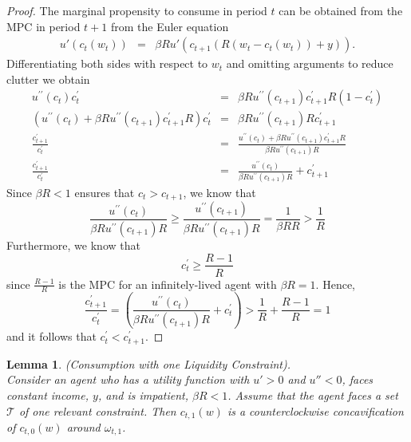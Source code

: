\documentclass[titlepage]{\econtex}
\providecommand{\wAlt}{\omega}
\newtheorem{lemma}{Lemma}
\begin{document}
	\begin{proof}
	The marginal propensity to consume in period $t$ can be obtained from the MPC in period $t+1$ from the Euler equation
	\begin{eqnarray*}
		u'(c_{t}(w_{t})) & =  & \beta R u'(c_{t+1}(R(w_{t}-c_{t}(w_{t}))+{y})).
	\end{eqnarray*}
	Differentiating both sides with respect to $w_{t}$ and omitting arguments to reduce
	clutter we obtain
	\begin{eqnarray*}
		u^{\prime\prime}(c_{t})c_{t}^{\prime} & =  & \beta R u^{\prime\prime}(c_{t+1})c_{t+1}^{\prime}R(1-c_{t}^{\prime}) \nonumber
		\\ \nonumber (u^{\prime\prime}(c_{t}) + \beta R u^{\prime\prime}(c_{t+1})c_{t+1}^{\prime}R)c_{t}^{\prime} & = & \beta R u^{\prime\prime}(c_{t+1})Rc_{t+1}^{\prime}
		\\ \frac{c_{t+1}^{\prime}}{c_{t}^{\prime}}   & = & \frac{u^{\prime\prime}(c_{t}) + \beta R u^{\prime\prime}(c_{t+1})c_{t+1}^{\prime}R}{\beta R u^{\prime\prime}(c_{t+1})R} \label{eq:mpcPF} \\
		\frac{c_{t+1}^{\prime}}{c_{t}^{\prime}}   & = & \frac{u^{\prime\prime}(c_{t})}{\beta R u^{\prime\prime}(c_{t+1})R} + c_{t+1}^{\prime} %
	\end{eqnarray*}
	Since $\beta R < 1$ ensures that $c_{t} > c_{t+1}$, we know that
	\[\frac{u^{\prime\prime}(c_{t})}{\beta R u^{\prime\prime}(c_{t+1})R} \geq  \frac{u^{\prime\prime}(c_{t+1})}{\beta R u^{\prime\prime}(c_{t+1})R} = \frac{1}{\beta R R} > \frac{1}{R}\]
	Furthermore, we know that
	\[c_{t}^{\prime} \geq \frac{R-1}{R}\]
	since $\frac{R-1}{R}$ is the MPC for an infinitely-lived agent with $\beta R = 1$. Hence, 
	\[\frac{c_{t+1}^{\prime}}{c_{t}^{\prime}} = \left(\frac{u^{\prime\prime}(c_{t})}{\beta R u^{\prime\prime}(c_{t+1})R} + c_{t}^{\prime} \right) > \frac{1}{R} + \frac{R-1}{R} = 1\]
	and it follows that $c_{t}^{\prime} <  c_{t+1}^{\prime}$.
	\end{proof}

	
	\begin{lemma}\label{lem:pfclc}(Consumption with one Liquidity Constraint). \\
		Consider an agent who has a utility function with $u'> 0 $ and $u'' < 0$, faces constant income, ${y}$, and is impatient, $\beta R < 1$. Assume that the agent faces a set $\mathcal{T}$ of one relevant constraint. Then $c_{t,1}(w)$ is a counterclockwise concavification of $c_{t,0}(w)$ around $\wAlt_{t,1}$.
	\end{lemma}
	
\end{document}
